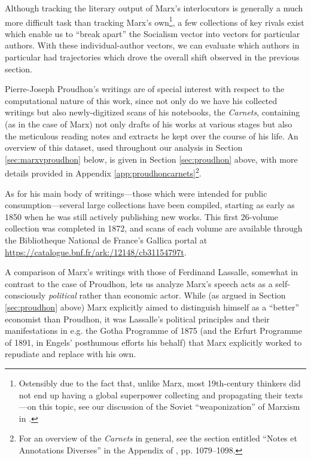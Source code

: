 Although tracking the literary output of Marx's interlocutors is generally a much more difficult task than tracking Marx's own\footnote{Ostensibly due to the fact that, unlike Marx, most 19th-century thinkers did not end up having a global superpower collecting and propagating their texts---on this topic, see our discussion of the Soviet ``weaponization'' of Marxism in \cite{jacobs_quantifying_2021}.}, a few collections of key rivals exist which enable us to ``break apart'' the Socialism vector into vectors for particular authors. With these individual-author vectors, we can evaluate which authors in particular had trajectories which drove the overall shift observed in the previous section.

Pierre-Joseph Proudhon's writings are of special interest with respect to the computational nature of this work, since not only do we have his collected writings but also newly-digitized scans of his notebooks, the \textit{Carnets}, containing (as in the case of Marx) not only drafts of his works at various stages but also the meticulous reading notes and extracts he kept over the course of his life. An overview of this dataset, used throughout our analysis in Section \ref{sec:marxvproudhon} below, is given in Section \ref{sec:proudhon} above, with more details provided in Appendix \ref{app:proudhoncarnets}\footnote{For an overview of the \textit{Carnets} in general, see the section entitled ``Notes et Annotations Diverses'' in the Appendix of \cite{haubtmann_pierre_1982}, pp. 1079--1098.}.

As for his main body of writings---those which were intended for public consumption---several large collections have been compiled, starting as early as 1850 when he was still actively publishing new works. This first 26-volume collection was completed in 1872, and scans of each volume are available through the Bibliotheque National de France's Gallica portal at \href{https://catalogue.bnf.fr/ark:/12148/cb31154797t}{https://catalogue.bnf.fr/ark:/12148/cb31154797t}.

A comparison of Marx's writings with those of Ferdinand Lassalle, somewhat in contrast to the case of Proudhon, lets us analyze Marx's speech acts as a self-consciously \textit{political} rather than economic actor. While (as argued in Section \ref{sec:proudhon} above) Marx explicitly aimed to distinguish himself as a ``better'' economist than Proudhon, it was Lassalle's political principles and their manifestations in e.g. the Gotha Programme of 1875 (and the Erfurt Programme of 1891, in Engels' posthumous efforts his behalf) that Marx explicitly worked to repudiate and replace with his own.

